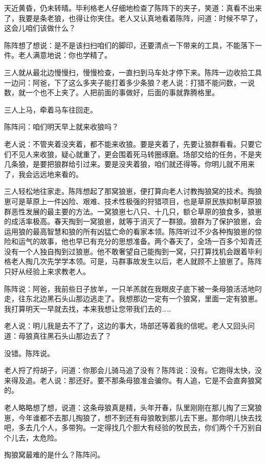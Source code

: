 \par 天近黄昏，仍未转晴。毕利格老人仔细地检查了陈阵下的夹子，笑道：真看不出来了，我要是条老狼，也得让你夹住。老人又认真地看着陈阵，问道：时候不早了，这会儿咱们该做什么？
\par 陈阵想了想说：是不是该扫扫咱们的脚印，还要清点一下带来的工具，不能落下一件。老人满意地说：你也学精了。
\par 三人就从最北边慢慢扫，慢慢检查，一直扫到马车处才停下来。陈阵一边收拾工具一边问：阿爸，下了这么多夹子能打着多少条狼？老人说：打猎不能问数，一说数，就一个也不上夹了。人把前面的事做好，后面的事就靠腾格里。
\par 三人上马，牵着马车往回走。
\par 陈阵问：咱们明天早上就来收狼吗？
\par 老人说：不管夹着没夹着，都不能来收狼。要是夹着了，先要让狼群看看。只要它们不见人来收狼，疑心就重了，更会围着死马转圈琢磨。场部交给的任务，不是夹几条狼，是要把狼群给引过来。要是没夹着狼，咱们就还得等。你明儿就不用来了，我会远远地来看的。
\par 三人轻松地往家走。陈阵想起了那窝狼崽，便打算向老人讨教掏狼窝的技术。掏狼崽可是草原上一件凶险、艰难、技术性极强的狩猎项目，也是草原民族抑制草原狼群恶性发展的最主要的方法。一窝狼崽七八只、十几只，额仑草原的狼食多，狼崽的成活率极高。春天掏到一窝狼崽，就等于消灭了一群狼。狼群为了保护狼崽，会运用狼的最高智慧和狼的所有凶猛亡命的看家本领。陈阵听过不少各种掏狼崽的惊险和运气的故事，他也早已有充分的思想准备。两个春天了，全场一百多个知青还没有一个人独自掏到过狼崽。他不敢奢望自己能掏到一窝，只打算找机会跟着毕利格老人掏几次先学学本领。可是，马群事故发生以后，老人就顾不上狼崽了。陈阵只好从经验上来求教老人。
\par 陈阵说：阿爸，我前些日子放羊，一只羊羔就在我眼皮子底下被一条母狼活活地叼走，往东北边黑石头山那边逃走了。我想那边一定有一个狼窝，里面一定有狼崽。我打算明天一早就去找，本来我想让您带我们去的……
\par 老人说：明儿我是去不了了，这边的事大，场部还等着我的信呢。老人又回头问道：母狼真往黑石头山那边去了？
\par 没错。陈阵说。
\par 老人捋了捋胡子，问道：你那会儿骑马追了没有？陈阵说：没有。它跑得太快，没来得及追。老人说：那还好。要不那条母狼准会骗你。有人追，它是不会直奔狼窝的。
\par 老人略略想了想，说道：这条母狼真是精，头年开春，队里刚刚在那儿掏了三窝狼崽，今年谁都不去那儿掏狼了，想不到还有母狼敢到那儿去下崽。那你明儿快去找吧，多去几个人，多带狗。一定得找几个胆大有经验的牧民去，你们两个千万别自个儿去，太危险。
\par 掏狼窝最难的是什么？陈阵问。
